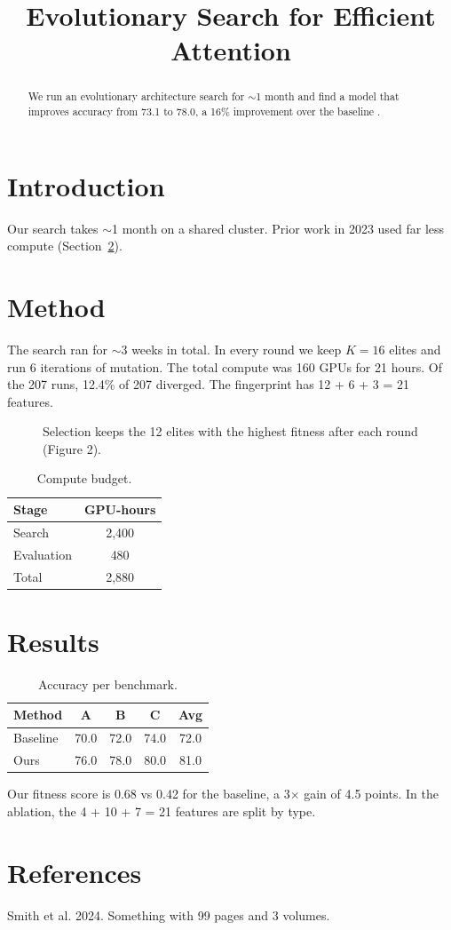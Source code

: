 \documentclass{article}
\title{Evolutionary Search for Efficient Attention}
\begin{document}
\maketitle
\begin{abstract}
We run an evolutionary architecture search for $\sim$1 month and find a model that improves accuracy from 73.1 to 78.0, a 16\% improvement over the baseline \citep{smith2024}.
\end{abstract}

\section{Introduction}
Our search takes $\sim$1 month on a shared cluster. Prior work in 2023 used far less compute (Section~\ref{sec:method}).

\section{Method}
\label{sec:method}
The search ran for $\sim$3 weeks in total. In every round we keep $K = 16$ elites and run 6 iterations of mutation. The total compute was 160 GPUs for 21 hours. Of the 207 runs, 12.4\% of 207 diverged. The fingerprint has 12 + 6 + 3 = 21 features.

\begin{figure}[t]
\caption{Selection keeps the 12 elites with the highest fitness after each round (Figure 2).}
\end{figure}

\begin{table}[t]
\caption{Compute budget.}
\begin{tabular}{lc}
\toprule
Stage & GPU-hours \\
\midrule
Search & 2,400 \\
Evaluation & 480 \\
Total & 2,880 \\
\bottomrule
\end{tabular}
\end{table}

\section{Results}
\begin{table}[t]
\caption{Accuracy per benchmark.}
\begin{tabular}{lcccc}
\toprule
Method & A & B & C & Avg \\
\midrule
Baseline & 70.0 & 72.0 & 74.0 & 72.0 \\
Ours & 76.0 & 78.0 & 80.0 & 81.0 \\
\bottomrule
\end{tabular}
\end{table}

Our fitness score is 0.68 vs 0.42 for the baseline, a 3$\times$ gain of 4.5 points. In the ablation, the 4 + 10 + 7 = 21 features are split by type.

\section*{References}
Smith et al. 2024. Something with 99 pages and 3 volumes.
\end{document}
